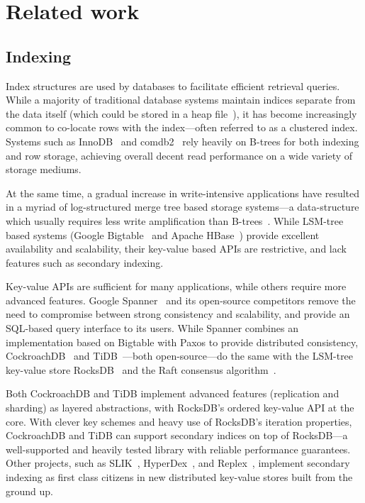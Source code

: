 \chapter{Related work}\label{chap:related-work}

\newpage

\section{Indexing}

Index structures are used by databases to facilitate efficient retrieval
queries. While a majority of traditional database systems maintain indices
separate from the data itself (which could be stored in \eg a heap
file~\cite{microsoft-heap, psql-heap}), it has become increasingly common to
co-locate rows with the index---often referred to as a clustered index.
Systems such as InnoDB~\cite{innodb-source} and comdb2~\cite{comdb2} rely
heavily on B-trees for both indexing and row storage, achieving overall decent
read performance on a wide variety of storage mediums.

At the same time, a gradual increase in write-intensive applications have
resulted in a myriad of log-structured merge tree based storage systems---a
data-structure which usually requires less write amplification than
B-trees~\cite{lsm-vs-b}. While LSM-tree based systems (\eg Google
Bigtable~\cite{bigtable} and Apache HBase~\cite{hbase}) provide excellent
availability and scalability, their key-value based APIs are restrictive, and
lack features such as secondary indexing.

Key-value APIs are sufficient for many applications, while others require more
advanced features. Google Spanner~\cite{spanner} and its open-source competitors
remove the need to compromise between strong consistency and scalability, and
provide an SQL-based query interface to its users. While Spanner combines an
implementation based on Bigtable with Paxos to provide distributed consistency,
CockroachDB~\cite{cockroach} and TiDB~\cite{tidb}---both open-source---do the
same with the LSM-tree key-value store RocksDB~\cite{rocksdb} and the Raft
consensus algorithm~\cite{raft}.

Both CockroachDB and TiDB implement advanced features (\eg replication and
sharding) as layered abstractions, with RocksDB's ordered key-value API at the
core. With clever key schemes and heavy use of RocksDB's iteration properties,
CockroachDB and TiDB can support secondary indices on top of RocksDB---a
well-supported and heavily tested library with reliable performance guarantees.
Other projects, such as SLIK~\cite{slik}, HyperDex~\cite{hyperdex}, and
Replex~\cite{replex}, implement secondary indexing as first class citizens in
new distributed key-value stores built from the ground up.


